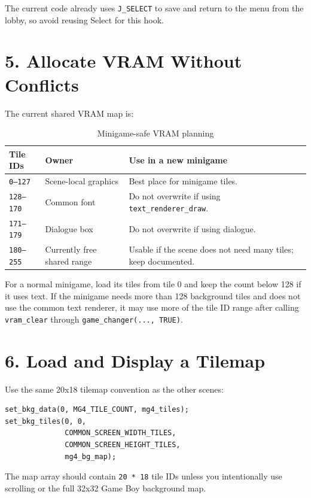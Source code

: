 The current code already uses \texttt{J\_SELECT} to save and return to the menu from the lobby, so avoid reusing Select for this hook.

\section{5. Allocate VRAM Without Conflicts}

The current shared VRAM map is:

\begin{table}[h]
\centering
\small
\begin{tabular}{p{2.6cm}p{4.0cm}p{6.8cm}}
\toprule
\textbf{Tile IDs} & \textbf{Owner} & \textbf{Use in a new minigame} \\
\midrule
\texttt{0--127} & Scene-local graphics & Best place for minigame tiles. \\
\texttt{128--170} & Common font & Do not overwrite if using \texttt{text\_renderer\_draw}. \\
\texttt{171--179} & Dialogue box & Do not overwrite if using dialogue. \\
\texttt{180--255} & Currently free shared range & Usable if the scene does not need many tiles; keep documented. \\
\bottomrule
\end{tabular}
\caption{Minigame-safe VRAM planning}
\end{table}

For a normal minigame, load its tiles from tile 0 and keep the count below 128 if it uses text. If the minigame needs more than 128 background tiles and does not use the common text renderer, it may use more of the tile ID range after calling \texttt{vram\_clear} through \texttt{game\_changer(..., TRUE)}.

\section{6. Load and Display a Tilemap}

Use the same 20x18 tilemap convention as the other scenes:

\begin{lstlisting}[caption={Tile and tilemap loading}]
set_bkg_data(0, MG4_TILE_COUNT, mg4_tiles);
set_bkg_tiles(0, 0,
              COMMON_SCREEN_WIDTH_TILES,
              COMMON_SCREEN_HEIGHT_TILES,
              mg4_bg_map);
\end{lstlisting}

The map array should contain \texttt{20 * 18} tile IDs unless you intentionally use scrolling or the full 32x32 Game Boy background map.

